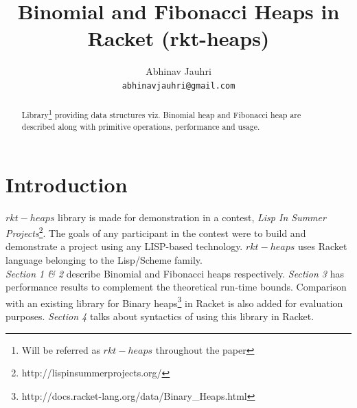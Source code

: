 \documentclass{llncs}
\title{Binomial and Fibonacci Heaps in Racket (rkt-heaps)}
\begin{document}
\author{
	Abhinav Jauhri\\
	\texttt{abhinavjauhri@gmail.com}\\
}


%




\maketitle

\begin{abstract}
	Library\footnote{Will be referred as $rkt-heaps$ throughout the paper} providing data structures viz. Binomial heap \cite{vuillemin1978data} and Fibonacci heap\cite{fredman1987fibonacci} are described along with primitive operations, performance and usage. 
\end{abstract}

\section{Introduction}
$rkt-heaps$ library is made for demonstration in a contest, \textit{Lisp In Summer Projects}\footnote{http://lispinsummerprojects.org/}. The goals of any participant in the contest were to build and demonstrate a project using any LISP-based technology. $rkt-heaps$ uses Racket language belonging to the Lisp/Scheme family. \\

\emph{Section 1 \& 2} describe Binomial and Fibonacci heaps respectively. \emph{Section 3} has performance results to complement the theoretical run-time bounds. Comparison with an existing library for Binary heaps\footnote{http://docs.racket-lang.org/data/Binary\_Heaps.html} in Racket is also added for evaluation purposes. \emph{Section 4} talks about syntactics of using this library in Racket.
\end{document}
